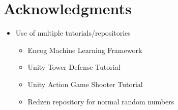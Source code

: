 \documentclass[letterpaper]{article}
\begin{document}
\section{Acknowledgments}
\begin{itemize}
    \item Use of multiple tutorials/repositories
    \begin{itemize}
        \item Encog Machine Learning Framework
        \item Unity Tower Defense Tutorial
        \item Unity Action Game Shooter Tutorial
        \item Redzen repository for normal random numbers
    \end{itemize}
\end{itemize}

\footnotesize

\end{document}
